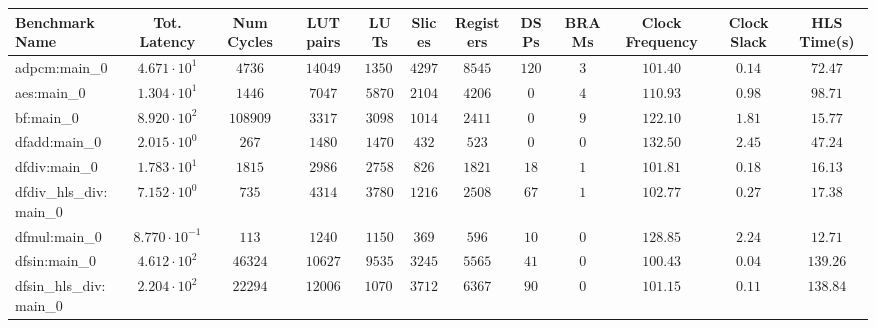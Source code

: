 \begin{tabular}{|l|c|c|c|c|c|c|c|c|c|c|c|}
\hline
Benchmark Name          & Tot. Latency            & Num Cycles & LUT pairs & LUTs      & Slices    & Registers & DSPs    & BRAMs  & Clock Frequency & Clock Slack & HLS Time(s) \\
\hline
adpcm:main\_0           & $ 4.671 \cdot 10^{1}  $ & $ 4736   $ & $ 14049 $ & $ 13500 $ & $ 4297  $ & $ 8545  $ & $ 120 $ & $ 3  $ & $ 101.40      $ & $ 0.14    $ & $ 72.47   $ \\
aes:main\_0             & $ 1.304 \cdot 10^{1}  $ & $ 1446   $ & $ 7047  $ & $ 5870  $ & $ 2104  $ & $ 4206  $ & $ 0   $ & $ 4  $ & $ 110.93      $ & $ 0.98    $ & $ 98.71   $ \\
bf:main\_0              & $ 8.920 \cdot 10^{2}  $ & $ 108909 $ & $ 3317  $ & $ 3098  $ & $ 1014  $ & $ 2411  $ & $ 0   $ & $ 9  $ & $ 122.10      $ & $ 1.81    $ & $ 15.77   $ \\
dfadd:main\_0           & $ 2.015 \cdot 10^{0}  $ & $ 267    $ & $ 1480  $ & $ 1470  $ & $ 432   $ & $ 523   $ & $ 0   $ & $ 0  $ & $ 132.50      $ & $ 2.45    $ & $ 47.24   $ \\
dfdiv:main\_0           & $ 1.783 \cdot 10^{1}  $ & $ 1815   $ & $ 2986  $ & $ 2758  $ & $ 826   $ & $ 1821  $ & $ 18  $ & $ 1  $ & $ 101.81      $ & $ 0.18    $ & $ 16.13   $ \\
dfdiv\_hls\_div:main\_0 & $ 7.152 \cdot 10^{0}  $ & $ 735    $ & $ 4314  $ & $ 3780  $ & $ 1216  $ & $ 2508  $ & $ 67  $ & $ 1  $ & $ 102.77      $ & $ 0.27    $ & $ 17.38   $ \\
dfmul:main\_0           & $ 8.770 \cdot 10^{-1} $ & $ 113    $ & $ 1240  $ & $ 1150  $ & $ 369   $ & $ 596   $ & $ 10  $ & $ 0  $ & $ 128.85      $ & $ 2.24    $ & $ 12.71   $ \\
dfsin:main\_0           & $ 4.612 \cdot 10^{2}  $ & $ 46324  $ & $ 10627 $ & $ 9535  $ & $ 3245  $ & $ 5565  $ & $ 41  $ & $ 0  $ & $ 100.43      $ & $ 0.04    $ & $ 139.26  $ \\
dfsin\_hls\_div:main\_0 & $ 2.204 \cdot 10^{2}  $ & $ 22294  $ & $ 12006 $ & $ 10706 $ & $ 3712  $ & $ 6367  $ & $ 90  $ & $ 0  $ & $ 101.15      $ & $ 0.11    $ & $ 138.84  $ \\

\end{tabular}
